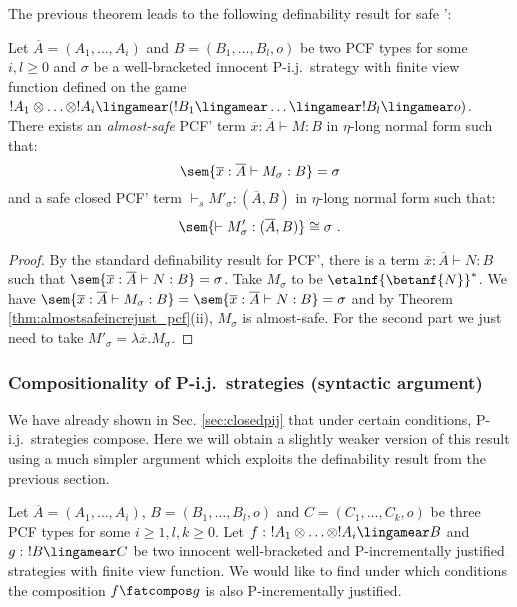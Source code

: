The previous theorem leads to the following definability result for safe \pcf':
\begin{proposition}
\label{prop:safetydefinability} Let $\overline{A}=(A_1,\ldots, A_i)$
and $B =(B_1, \ldots, B_l,o)$ be two PCF types for some $i,l\geq 0$
and $\sigma$ be a well-bracketed innocent P-i.j.\ strategy with
finite view function defined on the game $!A_1 \otimes \ldots
\otimes !A_i \lingamear (!B_1 \lingamear \ldots \lingamear !B_l
\lingamear o) $. There exists an \emph{almost-safe} PCF' term
$\overline{x} : \overline{A} \vdash M : B$ in $\eta$-long normal
form such that:
$$ \sem{\overline{x} : \overline{A} \vdash M_\sigma : B} = \sigma $$
and a safe closed PCF' term $\vdash_s M'_\sigma : (\overline{A},B)$ in $\eta$-long normal form such that:
$$ \sem{\vdash M'_\sigma : (\overline{A},B)} \cong \sigma \ .$$
\end{proposition}
\begin{proof}
By the standard definability result for PCF', there is a term
$\overline{x} : \overline{A} \vdash N : B$ such that
$\sem{\overline{x} :\overline{A} \vdash N : B} = \sigma$. Take
$M_\sigma$ to be $\etalnf{\betanf{N}}^* $. We have
$\sem{\overline{x} : \overline{A} \vdash M_\sigma : B} =
\sem{\overline{x} :\overline{A} \vdash N : B} = \sigma$ and by
Theorem  \ref{thm:almostsafeincrejust_pcf}(ii), $M_\sigma$ is
almost-safe. For the second part we just need to take $M'_\sigma =
\lambda \overline{x}. M_\sigma$.
\end{proof}


\subsubsection{Compositionality of P-i.j.\ strategies (syntactic
argument)}


We have already shown in Sec. \ref{sec:closedpij} that under certain
conditions, P-i.j.\ strategies compose. Here we will obtain a
slightly weaker version of this result using a much simpler argument
which exploits the definability result from the previous section.


 Let $\overline{A} = (A_1, \ldots, A_i)$, $B = (B_1, \ldots,
B_l,o)$ and $C=(C_1,\ldots,C_k,o)$ be three PCF types for some
$i\geq 1,l,k\geq 0$. Let $f:\ !A_1 \otimes \ldots \otimes !A_i
\lingamear B$ and $g:\ !B\lingamear C$ be two innocent
well-bracketed and P-incrementally justified strategies with finite
view function. We would like to find under which conditions the
composition $f\fatcompos g$ is also P-incrementally justified.

